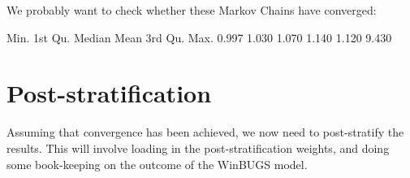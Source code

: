 \documentclass[12pt,twoside]{article}
\newenvironment{Shaded}{}{}
\newcommand{\KeywordTok}[1]{\textcolor[rgb]{0.00,0.44,0.13}{\textbf{{#1}}}}
\newcommand{\StringTok}[1]{\textcolor[rgb]{0.25,0.44,0.63}{{#1}}}
\newcommand{\NormalTok}[1]{{#1}}
\begin{document}
We probably want to check whether these Markov Chains have converged:

\begin{Shaded}
\end{Shaded}

Min. 1st Qu. Median Mean 3rd Qu. Max. 0.997 1.030 1.070 1.140 1.120
9.430

\section{Post-stratification}\label{post-stratification}

Assuming that convergence has been achieved, we now need to
post-stratify the results. This will involve loading in the
post-stratification weights, and doing some book-keeping on the outcome
of the WinBUGS model.
\end{document}
